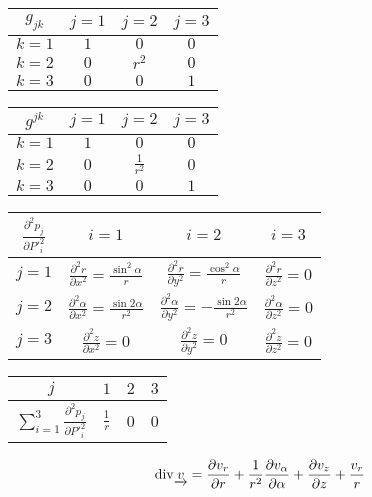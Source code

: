\begin{tabular}{| c || c | c | c |}
\hline
\(g_{jk}\) & \(j=1\) & \(j=2\) & \(j=3\) \\
\hline
\hline
\(k=1\) & \(1\) & \(0\) & \(0\) \\
\hline
\(k=2\) & \(0\) & \(r^2\) & \(0\) \\
\hline
\(k=3\) & \(0\) & \(0\) & \(1\) \\
\hline
\end{tabular}

\begin{tabular}{| c || c | c | c |}
\hline
\(g^{jk}\) & \(j=1\) & \(j=2\) & \(j=3\) \\
\hline
\hline
\(k=1\) & \(1\) & \(0\) & \(0\) \\
\hline
\(k=2\) & \(0\) & \(\frac{1}{r^2}\) & \(0\) \\
\hline
\(k=3\) & \(0\) & \(0\) & \(1\) \\
\hline
\end{tabular}

\begin{tabular}{| c || c | c | c |}
\hline
\(\frac{\partial^2 p_j}{\partial P'^2_i}\) & \(i=1\) & \(i=2\) & \(i=3\) \\
\hline
\hline
\(j=1\) & \(\frac{\partial^2 r}{\partial x^2} = \frac{\sin^2 \alpha}{r}\) & \(\frac{\partial^2 r}{\partial y^2} = \frac{\cos^2 \alpha}{r}\) & \(\frac{\partial^2 r}{\partial z^2} = 0\) \\
\hline
\(j=2\) & \(\frac{\partial^2 \alpha}{\partial x^2} = \frac{\sin 2 \alpha}{r^2}\) & \(\frac{\partial^2 \alpha}{\partial y^2} = -\frac{\sin 2\alpha}{r^2}\) & \(\frac{\partial^2 \alpha}{\partial z^2} = 0\) \\
\hline
\(j=3\) & \(\frac{\partial^2 z}{\partial x^2} = 0\) & \(\frac{\partial^2 z}{\partial y^2} = 0\) & \(\frac{\partial^2 z}{\partial z^2} = 0\) \\
\hline
\end{tabular}


\begin{tabular}{| c || c | c | c |}
\hline
\(j\) & \(1\) & \(2\) & \(3\) \\
\hline
\hline
\(\sum_{i=1}^3 \frac{\partial^2 p_j}{\partial P'^2_i}\) & \(\frac{1}{r}\) & 0 & 0 \\
\hline
\end{tabular}

\begin{equation}
\label{eq:cylindricky_ss_div}
\mathrm{div}{\underrightarrow{v}} = \frac{\partial v_r}{\partial r} + \frac{1}{r^2} \frac{\partial v_{\alpha}}{\partial \alpha} + \frac{\partial v_z}{\partial z} + \frac{v_r}{r}
\end{equation}

